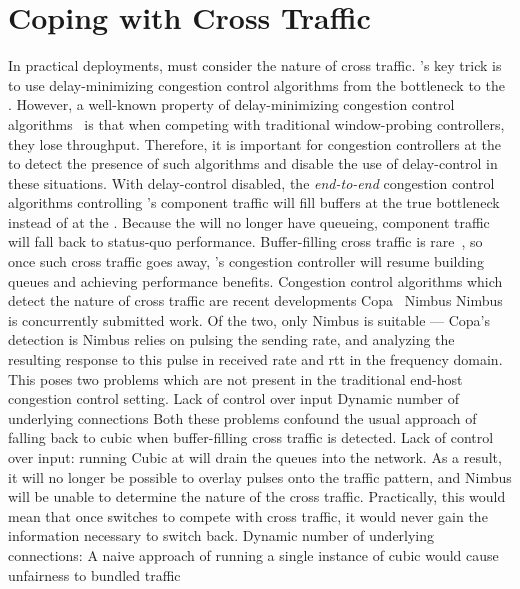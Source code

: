 \section{Coping with Cross Traffic}\label{s:queue-ctl}

\begin{outline}
\1 In practical deployments, \name must consider the nature of cross traffic.
\1 \name's key trick is to use delay-minimizing congestion control algorithms from the bottleneck to the \inbox.
\1 However, a well-known property of delay-minimizing congestion control algorithms~\cite{pantheon} is that when competing with traditional window-probing controllers, they lose throughput.
\1 Therefore, it is important for congestion controllers at the \inbox to detect the presence of such algorithms and disable the use of delay-control in these situations.
    \2 With delay-control disabled, the \emph{end-to-end} congestion control algorithms controlling \name's component traffic will fill buffers at the true bottleneck instead of at the \inbox.
    \2 Because the \inbox will no longer have queueing, component traffic will fall back to status-quo performance.
    \2 Buffer-filling cross traffic is rare~\cite{something}, so once such cross traffic goes away, \name's congestion controller will resume building queues and achieving performance benefits.
\1 Congestion control algorithms which detect the nature of cross traffic are recent developments
    \2 Copa~\cite{copa}
    \2 Nimbus
        \3 Nimbus is concurrently submitted work.
    \2 Of the two, only Nimbus is suitable --- Copa's detection is 
\1 Nimbus relies on pulsing the sending rate, and analyzing the resulting response to this pulse in received rate and rtt in the frequency domain.
    \2 This poses two problems which are not present in the traditional end-host congestion control setting.
        \3 Lack of control over input
        \3 Dynamic number of underlying connections
    \2 Both these problems confound the usual approach of falling back to cubic when buffer-filling cross traffic is detected.
        \3 Lack of control over input: running Cubic at \inbox will drain the queues into the network. As a result, it will no longer be possible to overlay pulses onto the traffic pattern, and Nimbus will be unable to determine the nature of the cross traffic.
            \4 Practically, this would mean that once \inbox switches to compete with cross traffic, it would never gain the information necessary to switch back.
        \3 Dynamic number of underlying connections: A naive approach of running a single instance of cubic would cause unfairness to bundled traffic

\end{outline}
